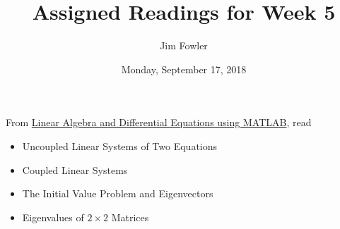 \documentclass{homework}
\author{Jim Fowler}
\title{Assigned Readings for Week 5}
\date{Monday, September 17, 2018}
\begin{document}
\maketitle

From \href{/courses/43735/files/folder/textbooks}{Linear Algebra and Differential Equations using MATLAB}, read 
\begin{itemize}
\item {} Uncoupled Linear Systems of Two Equations
\item {} Coupled Linear Systems
\item {} The Initial Value Problem and Eigenvectors
\item {} Eigenvalues of $2\times 2$ Matrices
\end{itemize}
\end{document}
